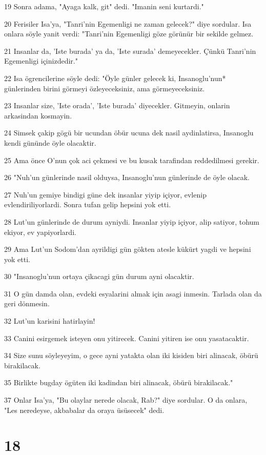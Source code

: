 \par 19 Sonra adama, "Ayaga kalk, git" dedi. "Imanin seni kurtardi."
\par 20 Ferisiler Isa'ya, "Tanri'nin Egemenligi ne zaman gelecek?" diye sordular. Isa onlara söyle yanit verdi: "Tanri'nin Egemenligi göze görünür bir sekilde gelmez.
\par 21 Insanlar da, 'Iste burada' ya da, 'Iste surada' demeyecekler. Çünkü Tanri'nin Egemenligi içinizdedir."
\par 22 Isa ögrencilerine söyle dedi: "Öyle günler gelecek ki, Insanoglu'nun* günlerinden birini görmeyi özleyeceksiniz, ama görmeyeceksiniz.
\par 23 Insanlar size, 'Iste orada', 'Iste burada' diyecekler. Gitmeyin, onlarin arkasindan kosmayin.
\par 24 Simsek çakip gögü bir ucundan öbür ucuna dek nasil aydinlatirsa, Insanoglu kendi gününde öyle olacaktir.
\par 25 Ama önce O'nun çok aci çekmesi ve bu kusak tarafindan reddedilmesi gerekir.
\par 26 "Nuh'un günlerinde nasil olduysa, Insanoglu'nun günlerinde de öyle olacak.
\par 27 Nuh'un gemiye bindigi güne dek insanlar yiyip içiyor, evlenip evlendiriliyorlardi. Sonra tufan gelip hepsini yok etti.
\par 28 Lut'un günlerinde de durum ayniydi. Insanlar yiyip içiyor, alip satiyor, tohum ekiyor, ev yapiyorlardi.
\par 29 Ama Lut'un Sodom'dan ayrildigi gün gökten atesle kükürt yagdi ve hepsini yok etti.
\par 30 "Insanoglu'nun ortaya çikacagi gün durum ayni olacaktir.
\par 31 O gün damda olan, evdeki esyalarini almak için asagi inmesin. Tarlada olan da geri dönmesin.
\par 32 Lut'un karisini hatirlayin!
\par 33 Canini esirgemek isteyen onu yitirecek. Canini yitiren ise onu yasatacaktir.
\par 34 Size sunu söyleyeyim, o gece ayni yatakta olan iki kisiden biri alinacak, öbürü birakilacak.
\par 35 Birlikte bugday ögüten iki kadindan biri alinacak, öbürü birakilacak."
\par 37 Onlar Isa'ya, "Bu olaylar nerede olacak, Rab?" diye sordular. O da onlara, "Les neredeyse, akbabalar da oraya üsüsecek" dedi.

\chapter{18}

